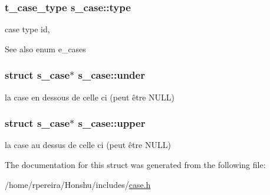 \subsubsection[{\texorpdfstring{type}{type}}]{\setlength{\rightskip}{0pt plus 5cm}t\+\_\+case\+\_\+type s\+\_\+case\+::type}\hypertarget{structs__case_a4c656b1851b67d43646011c5790f7f69}{}\label{structs__case_a4c656b1851b67d43646011c5790f7f69}
case type id, \begin{DoxySeeAlso}{See also}
enum e\+\_\+cases 
\end{DoxySeeAlso}
\subsubsection[{\texorpdfstring{under}{under}}]{\setlength{\rightskip}{0pt plus 5cm}struct {\bf s\+\_\+case}$\ast$ s\+\_\+case\+::under}\hypertarget{structs__case_a78554a4a011ef2fca3d8542312f64870}{}\label{structs__case_a78554a4a011ef2fca3d8542312f64870}
la case en dessous de celle ci (peut être N\+U\+LL) 
\subsubsection[{\texorpdfstring{upper}{upper}}]{\setlength{\rightskip}{0pt plus 5cm}struct {\bf s\+\_\+case}$\ast$ s\+\_\+case\+::upper}\hypertarget{structs__case_a5e98a39abc778b8e24c6f3ac0c447535}{}\label{structs__case_a5e98a39abc778b8e24c6f3ac0c447535}
la case au dessus de celle ci (peut être N\+U\+LL) 

The documentation for this struct was generated from the following file\+:\begin{DoxyCompactItemize}
\item 
/home/rpereira/\+Honshu/includes/\hyperlink{case_8h}{case.\+h}\end{DoxyCompactItemize}
